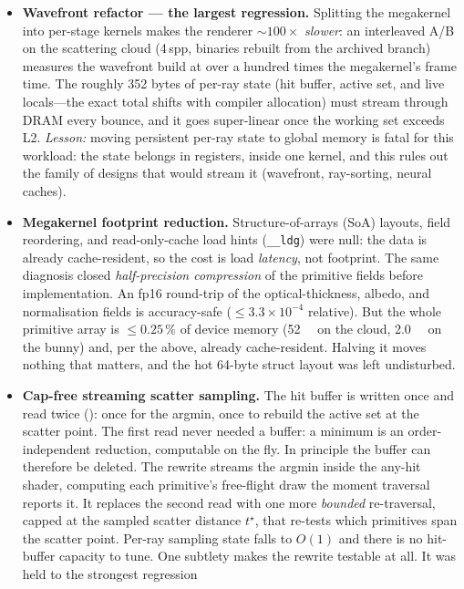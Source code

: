 \begin{itemize}
  \item \textbf{Wavefront refactor --- the largest regression.} Splitting the megakernel into per-stage
  kernels makes the renderer ${\sim}100\times$ \emph{slower}: an interleaved A/B on the
  scattering cloud (\num{4}\,spp, binaries rebuilt from the archived branch) measures the
  wavefront build at over a hundred times the megakernel's frame time. The roughly \num{352} bytes of per-ray state (hit buffer, active set, and live
locals---the exact total shifts with compiler allocation) must stream through DRAM
  every bounce, and it goes super-linear once the working set exceeds L2. \emph{Lesson:} moving persistent
  per-ray state to global memory is fatal for this workload: the state belongs in registers,
inside one kernel, and this rules out the family of designs that would stream it
(wavefront, ray-sorting, neural caches).
  \item \textbf{Megakernel footprint reduction.} Structure-of-arrays (SoA) layouts, field
  reordering, and read-only-cache load hints (\texttt{\_\_ldg}) were null: the data is already
  cache-resident, so the cost is load
  \emph{latency}, not footprint. The same diagnosis closed \emph{half-precision compression} of the
  primitive fields before implementation. An fp16 round-trip of the optical-thickness, albedo,
  and normalisation fields is accuracy-safe ($\le 3.3\times10^{-4}$ relative).
  But the whole primitive array is ${\le}\num{0.25}\,\%$ of device memory (\SI{52}{\kilo\byte} on
  the cloud, \SI{2.0}{\mega\byte} on the bunny) and, per the above, already cache-resident.
  Halving it moves nothing that matters, and the hot \num{64}-byte struct layout was left
  undisturbed.
  \item \textbf{Cap-free streaming scatter sampling.} The hit
  buffer is written once and read twice (): once for the argmin, once to rebuild the
  active set at the scatter point. The first read never needed a buffer: a minimum is an
  order-independent reduction, computable on the fly. In principle the buffer can therefore be
  deleted. The rewrite streams the argmin inside the any-hit shader, computing each primitive's
  free-flight draw the moment traversal reports it. It replaces the second read with one more
  \emph{bounded} re-traversal, capped at the sampled scatter distance $t^\star$, that re-tests
  which primitives span the scatter
  point. Per-ray
  sampling state falls to $O(1)$ and there is no hit-buffer capacity to tune. One subtlety makes the rewrite testable at all. It was held to the strongest regression

\end{itemize}
